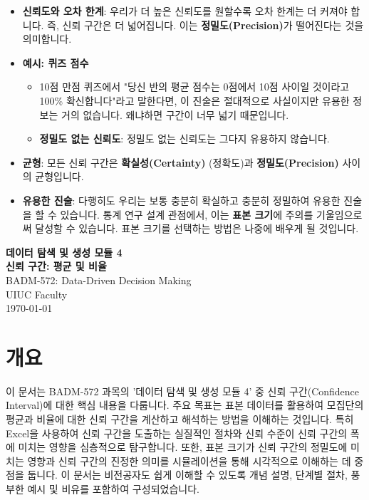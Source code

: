 \documentclass[11pt,a4paper]{article}
\begin{document}
\begin{itemize}
    \item \textbf{신뢰도와 오차 한계}: 우리가 더 높은 신뢰도를 원할수록 오차 한계는 더 커져야 합니다. 즉, 신뢰 구간은 더 넓어집니다. 이는 \textbf{정밀도(Precision)}가 떨어진다는 것을 의미합니다.
    \item \textbf{예시: 퀴즈 점수}
    \begin{itemize}
        \item 10점 만점 퀴즈에서 "당신 반의 평균 점수는 0점에서 10점 사이일 것이라고 100\% 확신합니다"라고 말한다면, 이 진술은 절대적으로 사실이지만 유용한 정보는 거의 없습니다. 왜냐하면 구간이 너무 넓기 때문입니다.
        \item \textbf{정밀도 없는 신뢰도}: 정밀도 없는 신뢰도는 그다지 유용하지 않습니다.
    \end{itemize}
    \item \textbf{균형}: 모든 신뢰 구간은 \textbf{확실성(Certainty)} (정확도)과 \textbf{정밀도(Precision)} 사이의 균형입니다.
    \item \textbf{유용한 진술}: 다행히도 우리는 보통 충분히 확실하고 충분히 정밀하여 유용한 진술을 할 수 있습니다. 통계 연구 설계 관점에서, 이는 \textbf{표본 크기}에 주의를 기울임으로써 달성할 수 있습니다. 표본 크기를 선택하는 방법은 나중에 배우게 될 것입니다.
\end{itemize}

\newpage

\begin{center}
    \vspace*{2cm}
    {\Huge \textbf{데이터 탐색 및 생성 모듈 4}} \\
    \vspace{0.5cm}
    {\Large \textbf{신뢰 구간: 평균 및 비율}} \\
    \vspace{1cm}
    {\large BADM-572: Data-Driven Decision Making} \\
    \vspace{0.5cm}
    {\normalsize UIUC Faculty} \\
    \vspace{2cm}
    \today
\end{center}
\newpage

\section*{개요}
이 문서는 BADM-572 과목의 '데이터 탐색 및 생성 모듈 4' 중 신뢰 구간(Confidence Interval)에 대한 핵심 내용을 다룹니다.
주요 목표는 표본 데이터를 활용하여 모집단의 평균과 비율에 대한 신뢰 구간을 계산하고 해석하는 방법을 이해하는 것입니다.
특히 Excel을 사용하여 신뢰 구간을 도출하는 실질적인 절차와 신뢰 수준이 신뢰 구간의 폭에 미치는 영향을 심층적으로 탐구합니다.
또한, 표본 크기가 신뢰 구간의 정밀도에 미치는 영향과 신뢰 구간의 진정한 의미를 시뮬레이션을 통해 시각적으로 이해하는 데 중점을 둡니다.
이 문서는 비전공자도 쉽게 이해할 수 있도록 개념 설명, 단계별 절차, 풍부한 예시 및 비유를 포함하여 구성되었습니다.
\end{document}
